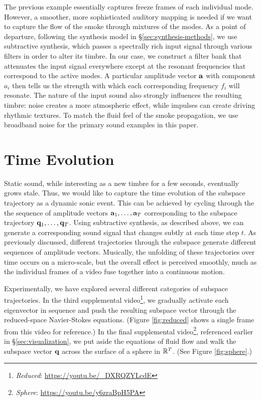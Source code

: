 The previous example essentially captures freeze frames of each individual mode. However, a smoother, more sophisticated auditory mapping is needed if we want to capture the flow of the smoke through mixtures of the modes. As a point of departure, following the synthesis model in \S \ref{sec:synthesis-methods}, we use subtractive synthesis, which passes a spectrally rich input signal through various filters in order to alter its timbre. In our case, we construct a filter bank that attenuates the input signal everywhere except at the resonant frequencies that correspond to the active modes. A particular amplitude vector $\mathbf{a}$ with component $a_i$ then tells us the strength with which each corresponding frequency $f_i$ will resonate. The nature of the input sound also strongly influences the resulting timbre: noise creates a more atmospheric effect, while impulses can create driving rhythmic textures. To match the fluid feel of the smoke propagation, we use broadband noise for the primary sound examples in this paper.

\section{Time Evolution}
Static sound, while interesting as a new timbre for a few seconds, eventually grows stale. Thus, we would like to capture the time evolution of the subspace trajectory as a dynamic sonic event. This can be achieved by cycling through the the sequence of amplitude vectors $\mathbf{a}_1, \ldots, \mathbf{a}_T$ corresponding to the subspace trajectory $\mathbf{q}_1, \ldots, \mathbf{q}_T$. Using subtractive synthesis, as described above, we can generate a corresponding sound signal that changes subtly at each time step $t$. As previously discussed, different trajectories through the subspace generate different sequences of amplitude vectors. Musically, the unfolding of these trajectories over time occurs on a micro-scale, but the overall effect is perceived smoothly, much as the individual frames of a video fuse together into a continuous motion.

Experimentally, we have explored several different categories of subspace trajectories. In the third supplemental video\footnote{{\em Reduced}: \url{https://youtu.be/_DXRQZYLcdE}}, we gradually activate each eigenvector in sequence and push the resulting subspace vector through the reduced-space Navier-Stokes equations. (Figure \ref{fig:reduced} shows a single frame from this video for reference.) In the final supplemental video\footnote{{\em Sphere}: \url{https://youtu.be/y6zraBpH5PA}}, referenced earlier in \S \ref{sec:visualization}, we put aside the equations of fluid flow and walk the subspace vector $\mathbf{q}$ across the surface of a sphere in $\mathbb{R}^T$. (See Figure \ref{fig:sphere}.)

